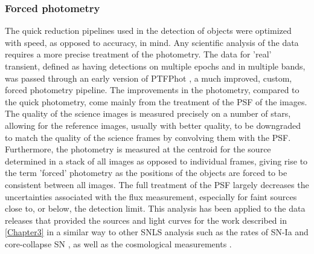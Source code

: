 \subsubsection{Forced photometry}
The quick reduction pipelines used in the detection of objects were optimized with speed, as opposed to accuracy, in mind. Any scientific analysis of the data requires a more precise treatment of the photometry. The data for 'real' transient, defined as having detections on multiple epochs and in multiple bands, was passed through an early version of PTFPhot \citep{Firth2015}, a much improved, custom, forced photometry pipeline. The improvements in the photometry, compared to the quick photometry, come mainly from the treatment of the PSF of the images. The quality of the science images is measured precisely on a number of stars, allowing for the reference images, usually with better quality, to be downgraded to match the quality of the science frames by convolving them with the PSF. Furthermore, the photometry is measured at the centroid for the source determined in a stack of all images as opposed to individual frames, giving rise to the term 'forced' photometry as the positions of the objects are forced to be consistent between all images. The full treatment of the PSF largely decreases the uncertainties associated with the flux measurement, especially for faint sources close to, or below, the detection limit. This analysis has been applied to the data releases that provided the sources and light curves for the work described in \cref{Chapter3} in a similar way to other SNLS analysis such as the rates of SN-Ia \citep{Perrett2012} and core-collapse SN \citep{Bazin2009}, as well as the cosmological measurements \citep{Astier2006,Sullivan2011}.

